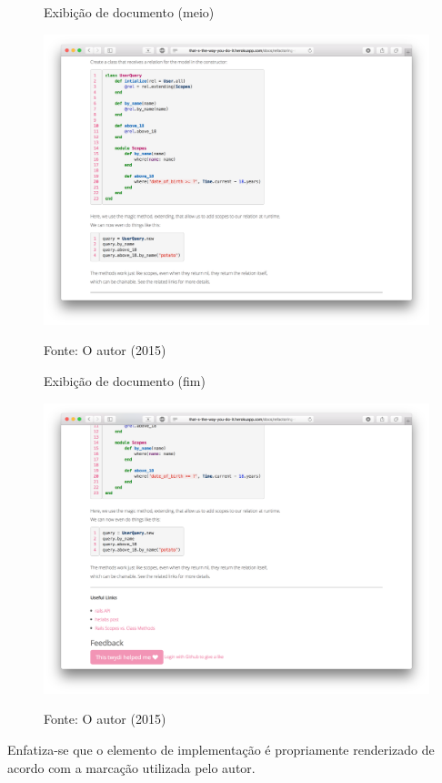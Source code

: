 \begin{figure}[h]
	\centering
    \caption{Exibição de documento (meio)}
    \includegraphics[width=15cm]{Imagens/print-show-2.png}
    \label{fig:doc-show-2}
	\caption*{Fonte: O autor (2015)}
\end{figure}

\begin{figure}[h]
	\centering
    \caption{Exibição de documento (fim)}
    \includegraphics[width=15cm]{Imagens/print-show-3.png}
    \label{fig:doc-show-3}
	\caption*{Fonte: O autor (2015)}
\end{figure}

Enfatiza-se que o elemento de implementação é propriamente renderizado de acordo com a marcação utilizada pelo autor.

